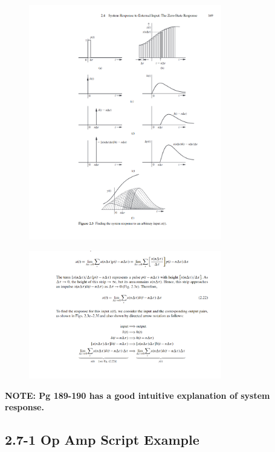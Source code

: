 \begin{figure}
    \begin{center}
        \includegraphics[width = 0.75\textwidth]{images/convolution.png}
    \end{center}
\end{figure}

\begin{figure}
    \begin{center}
       \includegraphics[width = 0.75\textwidth]{images/convolution_deriv.png}
    \end{center}
\end{figure}

\textbf{NOTE: Pg 189-190 has a good intuitive explanation of system response.}

\subsection{2.7-1 Op Amp Script Example}

